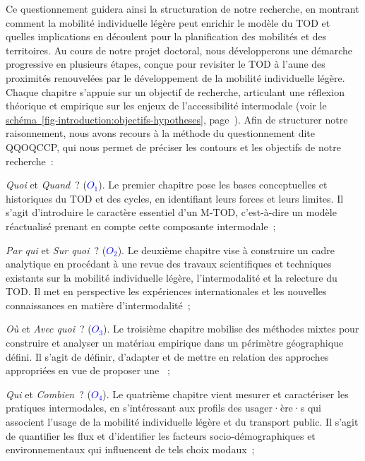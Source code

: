 \begin{refsegment}
Ce questionnement guidera ainsi la structuration de notre recherche, en montrant comment la mobilité individuelle légère peut enrichir le modèle du \acrshort{TOD} et quelles implications en découlent pour la planification des mobilités et des territoires. Au cours de notre projet doctoral, nous développerons une démarche progressive en plusieurs étapes, conçue pour revisiter le \acrshort{TOD} à l'aune des proximités renouvelées par le développement de la mobilité individuelle légère. Chaque chapitre s’appuie sur un objectif de recherche, articulant une réflexion théorique et empirique sur les enjeux de l'accessibilité intermodale (voir le \hyperref[fig-introduction:objectifs-hypotheses]{schéma~\ref{fig-introduction:objectifs-hypotheses}}, page~\pageref{fig-introduction:objectifs-hypotheses}). Afin de structurer notre raisonnement, nous avons recours à la méthode du questionnement dite \acrfull{QQOQCCP}, qui nous permet de préciser les contours et les objectifs de notre recherche~:
        \begin{customitemize}
    \item \textsl{Quoi} et \textsl{Quand}~? ({\textcolor{blue}{\(O_1\)}\label{objectif-1}}). Le premier chapitre pose les bases conceptuelles et historiques du \acrshort{TOD} et des cycles, en identifiant leurs forces et leurs limites. Il s’agit d’introduire le caractère essentiel d’un \acrshort{M-TOD}, c’est-à-dire un modèle réactualisé prenant en compte cette composante intermodale~;
    \item \textsl{Par qui} et \textsl{Sur quoi}~? ({\textcolor{blue}{\(O_2\)}\label{objectif-2}}). Le deuxième chapitre vise à construire un cadre analytique en procédant à une revue des travaux scientifiques et techniques existants sur la mobilité individuelle légère, l’\gls{intermodalité} et la relecture du \acrshort{TOD}. Il met en perspective les expériences internationales et les nouvelles connaissances en matière d'intermodalité~;
    \item \textsl{Où} et \textsl{Avec quoi}~? ({\textcolor{blue}{\(O_3\)}\label{objectif-3}}). Le troisième chapitre mobilise des méthodes mixtes pour construire et analyser un matériau empirique dans un périmètre géographique défini. Il s'agit de définir, d'adapter et de mettre en relation des approches appropriées en vue de proposer une ~;
    \item \textsl{Qui} et \textsl{Combien}~? ({\textcolor{blue}{\(O_4\)}\label{objectif-4}}). Le quatrième chapitre vient mesurer et caractériser les pratiques intermodales, en s’intéressant aux profils des usager·ère·s qui associent l'usage de la mobilité individuelle légère et du transport public. Il s’agit de quantifier les flux et d’identifier les facteurs socio-démographiques et environnementaux qui influencent de tels choix modaux~;

\end{customitemize}
\end{refsegment}
